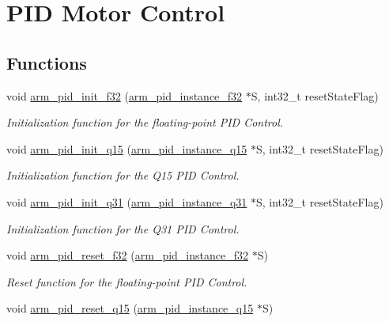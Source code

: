 \hypertarget{group___p_i_d}{\section{P\-I\-D Motor Control}
\label{group___p_i_d}
}
\subsection*{Functions}
\begin{DoxyCompactItemize}
\item 
void \hyperlink{group___p_i_d_gae31536b19b82b93ed184fb1ab73cfcb3}{arm\-\_\-pid\-\_\-init\-\_\-f32} (\hyperlink{structarm__pid__instance__f32}{arm\-\_\-pid\-\_\-instance\-\_\-f32} $\ast$S, int32\-\_\-t reset\-State\-Flag)
\begin{DoxyCompactList}\small\item\em Initialization function for the floating-\/point P\-I\-D Control. \end{DoxyCompactList}\item 
void \hyperlink{group___p_i_d_ga2cb1e3d3ebb167348fdabec74653d5c3}{arm\-\_\-pid\-\_\-init\-\_\-q15} (\hyperlink{structarm__pid__instance__q15}{arm\-\_\-pid\-\_\-instance\-\_\-q15} $\ast$S, int32\-\_\-t reset\-State\-Flag)
\begin{DoxyCompactList}\small\item\em Initialization function for the Q15 P\-I\-D Control. \end{DoxyCompactList}\item 
void \hyperlink{group___p_i_d_gad9d88485234fa9460b1ce9e64989ac86}{arm\-\_\-pid\-\_\-init\-\_\-q31} (\hyperlink{structarm__pid__instance__q31}{arm\-\_\-pid\-\_\-instance\-\_\-q31} $\ast$S, int32\-\_\-t reset\-State\-Flag)
\begin{DoxyCompactList}\small\item\em Initialization function for the Q31 P\-I\-D Control. \end{DoxyCompactList}\item 
void \hyperlink{group___p_i_d_ga9ec860bcb6f8ca31205bf0f1b51ab723}{arm\-\_\-pid\-\_\-reset\-\_\-f32} (\hyperlink{structarm__pid__instance__f32}{arm\-\_\-pid\-\_\-instance\-\_\-f32} $\ast$S)
\begin{DoxyCompactList}\small\item\em Reset function for the floating-\/point P\-I\-D Control. \end{DoxyCompactList}\item 
void \hyperlink{group___p_i_d_ga408566dacb4fa6e0458b2c75672e525f}{arm\-\_\-pid\-\_\-reset\-\_\-q15} (\hyperlink{structarm__pid__instance__q15}{arm\-\_\-pid\-\_\-instance\-\_\-q15} $\ast$S)

\end{DoxyCompactItemize}
